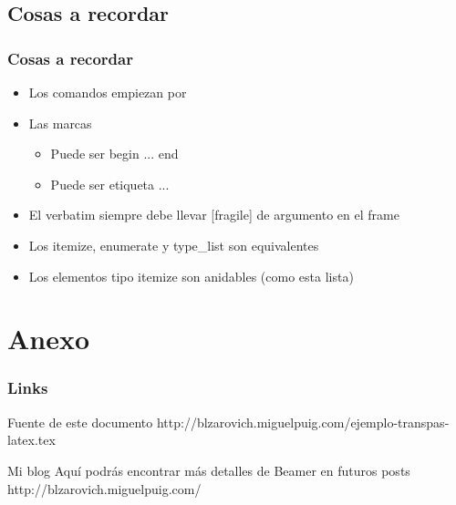 \documentclass{beamer}
\begin{document}
\subsection{Cosas a recordar}
	\begin{frame}
		\frametitle{Cosas a recordar}
		\begin{itemize}
			\item Los comandos empiezan por \
			\item Las marcas
			\begin{itemize}
				\item Puede ser begin ... end
				\item Puede ser etiqueta ... 
			\end{itemize}
			\item El verbatim siempre debe llevar [fragile] de argumento en el frame
			\item Los itemize, enumerate y type\_list son equivalentes
			\item Los elementos tipo itemize son anidables (como esta lista)
		\end{itemize}
	\end{frame}
	
\section{Anexo}
	\begin{frame}
		\frametitle{Links}
		\begin{block}{Fuente de este documento}
			http://blzarovich.miguelpuig.com/ejemplo-transpas-latex.tex
		\end{block}
		\begin{block}{Mi blog}
			Aquí podrás encontrar más detalles de Beamer en futuros posts
			http://blzarovich.miguelpuig.com/
		\end{block}
	\end{frame}
	
\end{document}
